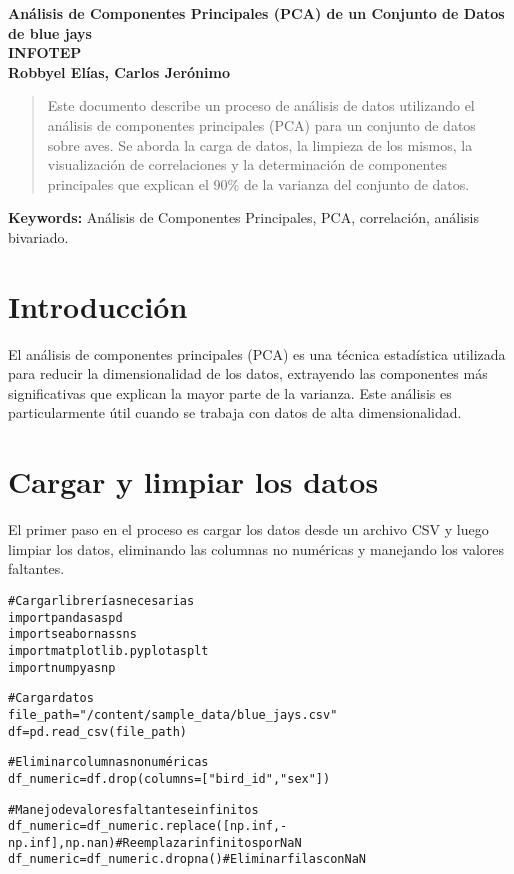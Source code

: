 \documentclass[a4paper, 10pt]{article}
\begin{document}
\begin{center}
\LARGE
\textbf{Análisis de Componentes Principales (PCA) de un Conjunto de Datos de blue jays}\\[6pt]
\small
\textbf{INFOTEP}\\[6pt]
\textbf{Robbyel Elías, Carlos Jerónimo}\\[6pt]
\end{center}

\begin{abstract}
Este documento describe un proceso de análisis de datos utilizando el análisis de componentes principales (PCA) para un conjunto de datos sobre aves. Se aborda la carga de datos, la limpieza de los mismos, la visualización de correlaciones y la determinación de componentes principales que explican el 90\% de la varianza del conjunto de datos.
\end{abstract}

\textbf{Keywords:} Análisis de Componentes Principales, PCA, correlación, análisis bivariado.

\section{Introducción}
El análisis de componentes principales (PCA) es una técnica estadística utilizada para reducir la dimensionalidad de los datos, extrayendo las componentes más significativas que explican la mayor parte de la varianza. Este análisis es particularmente útil cuando se trabaja con datos de alta dimensionalidad.

\section{Cargar y limpiar los datos}
El primer paso en el proceso es cargar los datos desde un archivo CSV y luego limpiar los datos, eliminando las columnas no numéricas y manejando los valores faltantes.

\begin{alltt}
# Cargar librerías necesarias
import pandas as pd
import seaborn as sns
import matplotlib.pyplot as plt
import numpy as np

# Cargar datos
file_path = "/content/sample_data/blue_jays.csv"
df = pd.read_csv(file_path)

# Eliminar columnas no numéricas
df_numeric = df.drop(columns=["bird_id", "sex"])

# Manejo de valores faltantes e infinitos
df_numeric = df_numeric.replace([np.inf, -np.inf], np.nan)  # Reemplazar infinitos por NaN
df_numeric = df_numeric.dropna()  # Eliminar filas con NaN
\end{alltt}
\end{document}
